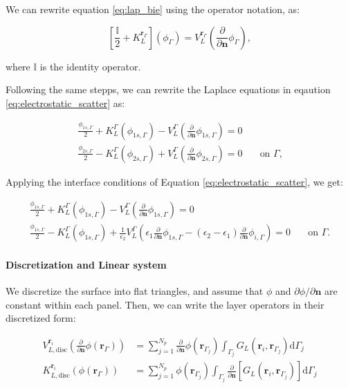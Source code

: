 We can rewrite equation \eqref{eq:lap_bie} using the operator notation, as:

\begin{equation} \label{eq:lap_operator}
\left[ \frac{\mathbb{I}}{2} + K_L^{\mathbf{r}_\Gamma} \right] \left( \phi_\Gamma \right) = V_L^{\mathbf{r}_\Gamma} \left( \frac{\partial}{\partial \mathbf{n}} \phi_\Gamma \right),
\end{equation}

\noindent where $\mathbb{I}$ is the identity operator.

Following the same stepps, we can rewrite the Laplace equations in eqaution
\eqref{eq:electrostatic_scatter} as:

%
\begin{align} \label{eq:integral_eq_lspr_nobc}
\frac{\phi_{1s,\Gamma}}{2}+ K_{L}^{\Gamma}(\phi_{1s,\Gamma}) - V_{L}^{\Gamma} \left(\frac{\partial}{\partial \mathbf{n}}\phi_{1s,\Gamma} \right) = 0&  \nonumber \\
\frac{\phi_{2s,\Gamma}}{2} - K_{L}^{\Gamma}(\phi_{2s,\Gamma}) + V_{L}^{\Gamma} \left( \frac{\partial}{\partial \mathbf{n}} \phi_{2s,\Gamma} \right) = 0& \quad \text{on $\Gamma$,}
\end{align}

Applying the interface conditions of Equation \eqref{eq:electrostatic_scatter},
we get:

\begin{align} \label{eq:integral_eq_lspr}
\frac{\phi_{1s,\Gamma}}{2}+ K_{L}^{\Gamma}(\phi_{1s,\Gamma}) - V_{L}^{\Gamma} \left(\frac{\partial}{\partial \mathbf{n}}\phi_{1s,\Gamma} \right) = 0&  \nonumber \\
\frac{\phi_{1s,\Gamma}}{2} - K_{L}^{\Gamma}(\phi_{1s,\Gamma}) + \frac{1}{\epsilon_2}V_{L}^{\Gamma} \left( \epsilon_1 \frac{\partial}{\partial \mathbf{n}} \phi_{1s,\Gamma} - (\epsilon_2-\epsilon_1) \frac{\partial}{\partial \mathbf{n}} \phi_{i,\Gamma} \right) = 0& \quad \text{on $\Gamma$.}
\end{align}


\paragraph{Discretization and Linear system}


We discretize the surface into flat triangles, and assume that  $\phi$ and 
$\partial \phi/\partial \mathbf{n}$ are constant within each panel. Then, we can
write the layer operators in their discretized form:

\begin{align} \label{eq:layers_disc}
V_{L,\text{disc}}^{\mathbf{r}_i} \left( \frac{\partial}{\partial \mathbf{n}} \phi(\mathbf{r}_{\Gamma}) \right) &= \sum_{j=1}^{N_p} \frac{\partial}{\partial \mathbf{n}} \phi(\mathbf{r}_{\Gamma_j}) \int_{\Gamma_j} G_L(\mathbf{r}_{i},\mathbf{r}_{\Gamma_j})  \mathrm{d} \Gamma_j  \nonumber \\
K_{L,\text{disc}}^{\mathbf{r}_i}(\phi(\mathbf{r}_{\Gamma})) &=  \sum_{j=1}^{N_p}\phi(\mathbf{r}_{\Gamma_j})\int_{\Gamma_j} \frac{\partial}{\partial \mathbf{n}} \left[ G_L(\mathbf{r}_{i},\mathbf{r}_{\Gamma_j}) \right]\mathrm{d} \Gamma_j
\end{align}

